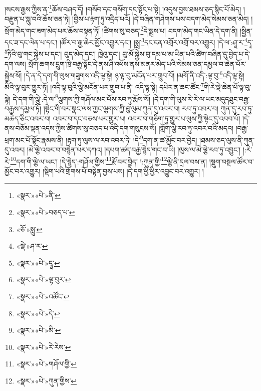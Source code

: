 །སངས་རྒྱས་ཀྱིས་ན་\footnote{«སྣར་»«པེ་»ནི་}ཆོས་བཤད་དོ། །གསོབ་དང་གསོག་དང་སྟོང་པ་སྟེ། །འདུས་བྱས་ཐམས་ཅད་སྙིང་པོ་མེད། །བརྫུན་པ་སླུ་བའི་ཆོས་ཅན་ཏེ། །བྱིས་པ་རྟག་ཏུ་འདྲིད་པའོ། །དེ་བཞིན་གཤེགས་པས་བདག་མེད་སེམས་ཅན་མེད། །སྲོག་མེད་གང་ཟག་མེད་པར་ཆོས་བསྟན་ཏོ། །ཚིགས་སུ་བཅད་\footnote{«སྣར་»«པེ་»བཅད་པ་}དེ་སྨྲས་པ། བདག་མེད་གང་ཡིན་དེ་དག་ནི། །སྦྱིན་དང་ཟ་དང་ལེན་པ་དང་། །ཚོར་བ་རྒྱ་ཆེར་མྱོང་འགྱུར་དང་། །སྨྲ་\footnote{«ཅོ་»སླུ་}དང་ངན་འགྲོར་འགྲོ་བར་འགྱུར། །དེ་ལ་:ཤཱ་ར་\footnote{«སྡེ་»ཤ་ར་}དྭ་\footnote{«སྣར་»«པེ་»དྭཱ་}ཏིའི་བུ་གང་སྐྱེས་པ་དང་། བུད་མེད་དང་། ཁྱེའུ་དང་། བུ་མོ་སྐྱེས་བུ་དམ་པ་མ་ཡིན་པའི་ཚིག་བཞིན་དུ་བྱེད་པ་དེ་དག་ལས། སྲོག་ཆགས་དྲུག་ཁྲི་བརྒྱ་སྟོང་དེ་ནས་ཤི་འཕོས་ནས་མནར་མེད་པའི་སེམས་ཅན་དམྱལ་བ་ཆེན་པོར་སྐྱེས་སོ། །དེ་ན་དེ་དག་གི་ལུས་གཟུགས་འདི་ལྟ་སྟེ། ཉ་ལྟ་བུ་མངོན་པར་གྲུབ་བོ། །མགོ་ནི་འདི་:ལྟ་བུ་\footnote{«སྣར་»«པེ་»ལྟ་བུར་}འདི་ལྟ་སྟེ། མིའི་ལྟ་བུར་གྱུར་ཏོ། །འདི་ལྟ་བུའི་ལྕེ་མངོན་པར་གྲུབ་པ་ནི། འདི་ལྟ་སྟེ། དཔེར་ན་ཆང་ཚོང་\footnote{«སྣར་»«པེ་»འཚོང་}གི་རེ་ལྡེ་ཆེན་པོ་ལྟ་བུ་སྟེ། དེ་དག་གི་ལྕེ་:དེ་ལ་\footnote{«སྣར་»«པེ་»དེ་}ལྕགས་ཀྱི་གཤོལ་མང་པོས་རབ་ཏུ་རྨོས་སོ། །དེ་དག་གི་ལུས་རེ་རེ་ལ་ཡང་མདུདཐུང་བརྒྱ་བརྒྱས་དམྱལ་ཏོ། །སྟེང་གི་བར་སྣང་ལས་ཀྱང་ལྕགས་ཀྱི་ཐུ་ལུམ་ཀུན་དུ་འབར་བ། རབ་ཏུ་འབར་བ། ཀུན་དུ་རབ་ཏུ་མཆེད་ཅིང་འབར་བ། འབར་བ་དང་བཅས་པར་གྱུར་པ། འབར་བ་གཅིག་ཏུ་གྱུར་པ་ལུས་ཀྱི་སྟེང་དུ་འབབ་པོ། །དེ་ནས་བཅོམ་ལྡན་འདས་ཀྱིས་ཚིགས་སུ་བཅད་པ་འདི་དག་གསུངས་སོ། །གློག་ལྕེ་རབ་ཏུ་འབར་བའི་མདའ། །བརྒྱ་ཕྲག་མང་པོ་སྟོང་རྣམས་ནི། །རྟག་ཏུ་ལུས་ལ་རབ་འབར་ཏེ། །དེ་\footnote{«སྣར་»«པེ་»མི་}དག་ན་ཚ་མྱོང་བར་བྱེད། །ཐམས་ཅད་ལུས་ནི་ཀུན་དུ་འབར། །མེ་ལྕེ་འབར་བ་བསྙེན་པར་དཀའ། །དཔག་ཚད་བརྒྱ་སྙེད་གང་བ་ཡི། །ལུས་ལ་མེ་ལྕེ་རབ་ཏུ་འབྱུང་། །:རེ་རེ་\footnote{«སྣར་»«པེ་»རེ་རེས་}དག་གི་ལྕེ་ལ་ཡང་། །དེ་སྙེད་:གཤོལ་གྱིས་\footnote{«སྣར་»«པེ་»གཤོལ་གྱི་}རྨོ་བར་བྱེད། །:ཀུན་གྱི་\footnote{«སྣར་»«པེ་»ཀུན་གྱིས་}ལྕེ་ནི་དྲལ་བས་ན། །སྡུག་བསྔལ་ཚོར་བ་མྱོང་བར་འགྱུར། །སྡིག་པའི་གྲོགས་པོ་བསྟེན་བྱས་པས། །དེ་དག་ཕྱི་ཕྱིར་འབྱུང་བར་འགྱུར། །
